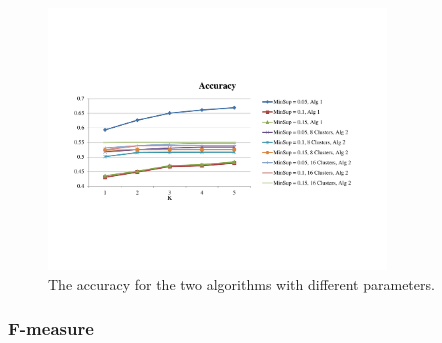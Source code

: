 \begin{figure}
\centering
\includegraphics[width=0.8\textwidth]{Accuracy}
\caption{\footnotesize The accuracy for the two algorithms with different
parameters. }
\label{Fig:Accuracy}
\end{figure}

\subsubsection{F-measure}


